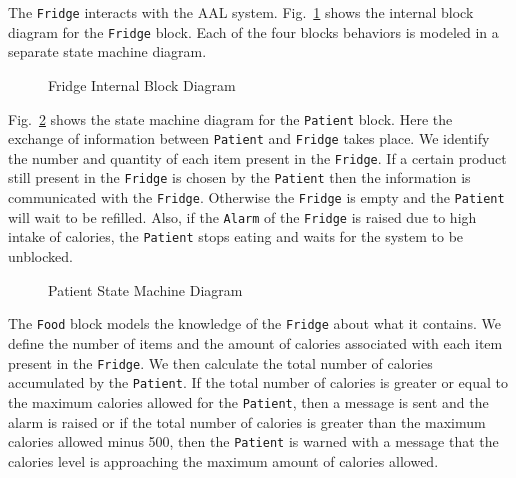 \documentclass[a4paper,twoside]{article}
\begin{document}
The \texttt{Fridge} interacts with the AAL system. Fig.~\ref{fig:fridgeibd} shows the internal block diagram for the \texttt{Fridge} block. Each of the four blocks behaviors is modeled in a separate state machine diagram.

\begin{figure}[!h]
  \centering
  {}
  \caption{Fridge Internal Block Diagram}
  \label{fig:fridgeibd}
 \end{figure}
 
Fig.~\ref{fig:patientstm} shows the state machine diagram for the \texttt{Patient} block. Here the exchange of information between \texttt{Patient} and \texttt{Fridge} takes place. We identify the number and quantity of each item present in the \texttt{Fridge}. If a certain product still present in the \texttt{Fridge} is chosen by the \texttt{Patient} then the information is  communicated with the \texttt{Fridge}.  Otherwise the \texttt{Fridge} is empty and the \texttt{Patient} will wait to be refilled. Also, if the \texttt{Alarm} of the \texttt{Fridge} is raised due to  high intake of calories, the \texttt{Patient} stops eating and waits for the system to be unblocked.
 
\begin{figure}[!h]
  \centering
  {}
  \caption{Patient State Machine Diagram}
  \label{fig:patientstm}
 \end{figure}
 
The \texttt{Food} block models the knowledge of the \texttt{Fridge} about what it contains. We define the number of items and the amount of calories associated with each item present in the \texttt{Fridge}. We then calculate the total number of calories accumulated by the \texttt{Patient}. If the total number of calories is greater or equal to the maximum calories allowed for the \texttt{Patient}, then a message is sent and the alarm is raised or if the total number of calories is greater than the maximum calories allowed minus 500, then the \texttt{Patient} is warned with a message that the calories level is approaching the maximum amount of calories allowed. 


\end{document}
